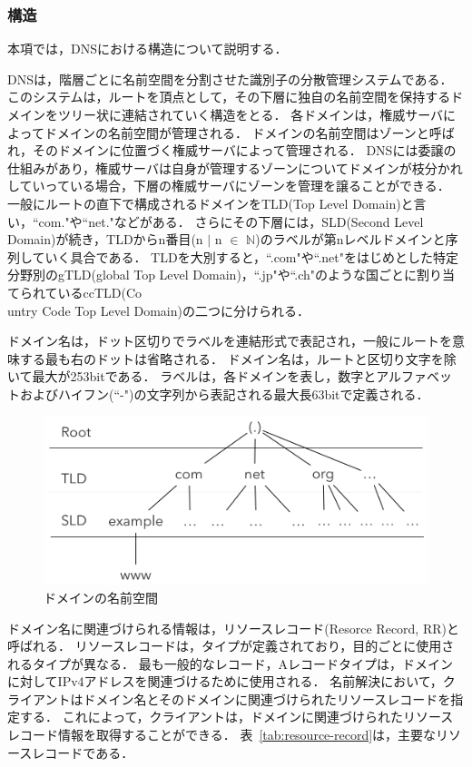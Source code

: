 \subsubsection{構造}
本項では，DNSにおける構造について説明する．

DNSは，階層ごとに名前空間を分割させた識別子の分散管理システムである．
このシステムは，ルートを頂点として，その下層に独自の名前空間を保持するドメインをツリー状に連結されていく構造をとる．
各ドメインは，権威サーバによってドメインの名前空間が管理される．
ドメインの名前空間はゾーンと呼ばれ，そのドメインに位置づく権威サーバによって管理される．
DNSには委譲の仕組みがあり，権威サーバは自身が管理するゾーンについてドメインが枝分かれしていっている場合，下層の権威サーバにゾーンを管理を譲ることができる．
一般にルートの直下で構成されるドメインをTLD(Top Level Domain)と言い，``com."や``net."などがある．
さらにその下層には，SLD(Second Level Domain)が続き，TLDからn番目(n $\mid$ n $\in$ $\mathbb{N}$)のラベルが第nレベルドメインと序列していく具合である．
TLDを大別すると，``.com"や``.net"をはじめとした特定分野別のgTLD(global Top Level Domain)，``.jp"や``.ch"のような国ごとに割り当てられているccTLD(Co\\untry Code Top Level Domain)の二つに分けられる．

ドメイン名は，ドット区切りでラベルを連結形式で表記され，一般にルートを意味する最も右のドットは省略される．
ドメイン名は，ルートと区切り文字を除いて最大が253bitである．
ラベルは，各ドメインを表し，数字とアルファベットおよびハイフン(``-")の文字列から表記される最大長63bitで定義される．

\begin{figure}[h]
 \centering
 \includegraphics[width=12.0cm]{figure/dns-architecture.png}
 \caption{ドメインの名前空間}
 \label{fig:dns-architecture}
\end{figure}



ドメイン名に関連づけられる情報は，リソースレコード(Resorce Record, RR)と呼ばれる．
リソースレコードは，タイプが定義されており，目的ごとに使用されるタイプが異なる．
最も一般的なレコード，Aレコードタイプは，ドメインに対してIPv4アドレスを関連づけるために使用される．
名前解決において，クライアントはドメイン名とそのドメインに関連づけられたリソースレコードを指定する．
これによって，クライアントは，ドメインに関連づけられたリソースレコード情報を取得することができる．
表~\ref{tab:resource-record}は，主要なリソースレコードである．


